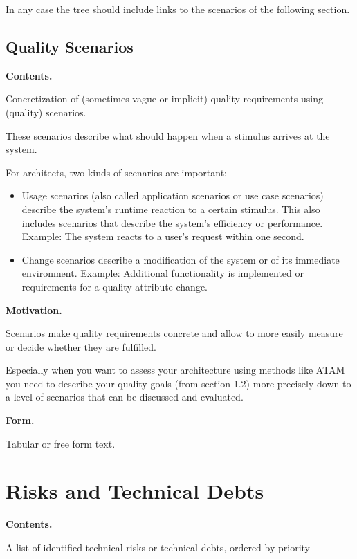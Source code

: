\documentclass[]{article}
\begin{document}
In any case the tree should include links to the scenarios of the
following section.

\hypertarget{_quality_scenarios}{%
\subsection{Quality Scenarios}\label{_quality_scenarios}}

\textbf{Contents.}

Concretization of (sometimes vague or implicit) quality requirements
using (quality) scenarios.

These scenarios describe what should happen when a stimulus arrives at
the system.

For architects, two kinds of scenarios are important:

\begin{itemize}
\item
  Usage scenarios (also called application scenarios or use case
  scenarios) describe the system's runtime reaction to a certain
  stimulus. This also includes scenarios that describe the system's
  efficiency or performance. Example: The system reacts to a user's
  request within one second.
\item
  Change scenarios describe a modification of the system or of its
  immediate environment. Example: Additional functionality is
  implemented or requirements for a quality attribute change.
\end{itemize}

\textbf{Motivation.}

Scenarios make quality requirements concrete and allow to more easily
measure or decide whether they are fulfilled.

Especially when you want to assess your architecture using methods like
ATAM you need to describe your quality goals (from section 1.2) more
precisely down to a level of scenarios that can be discussed and
evaluated.

\textbf{Form.}

Tabular or free form text.

\hypertarget{section-technical-risks}{%
\section{Risks and Technical Debts}\label{section-technical-risks}}

\textbf{Contents.}

A list of identified technical risks or technical debts, ordered by
priority
\end{document}
